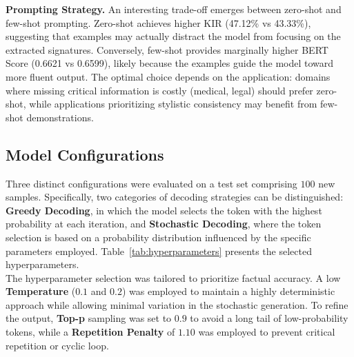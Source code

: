 \documentclass[conference]{IEEEtran}
\begin{document}
\textbf{Prompting Strategy.} An interesting trade-off emerges between zero-shot and few-shot prompting. Zero-shot achieves higher KIR (47.12\% vs 43.33\%), suggesting that examples may actually distract the model from focusing on the extracted signatures. Conversely, few-shot provides marginally higher BERT Score (0.6621 vs 0.6599), likely because the examples guide the model toward more fluent output. The optimal choice depends on the application: domains where missing critical information is costly (medical, legal) should prefer zero-shot, while applications prioritizing stylistic consistency may benefit from few-shot demonstrations.

\subsection{Model Configurations} \label{model config}
Three distinct configurations were evaluated on a test set comprising \(100\) new samples. Specifically, two categories of decoding strategies can be distinguished: \textbf{Greedy Decoding}, in which the model selects the token with the highest probability at each iteration, and \textbf{Stochastic Decoding}, where the token selection is based on a probability distribution influenced by the specific parameters employed. Table~\ref{tab:hyperparameters} presents the selected hyperparameters.\\
The hyperparameter selection was tailored to prioritize factual accuracy. A low \textbf{Temperature} ($0.1$ and $0.2$) was employed to maintain a highly deterministic approach while allowing minimal variation in the stochastic generation. To refine the output, \textbf{Top-p} sampling was set to $0.9$ to avoid a long tail of low-probability tokens, while a \textbf{Repetition Penalty} of $1.10$ was employed to prevent critical repetition or cyclic loop. 
\begin{table}[h]
\centering
{}
\caption{Hyperparameter settings for the experimental configurations.}
\label{tab:hyperparameters}
\end{table}
\end{document}
